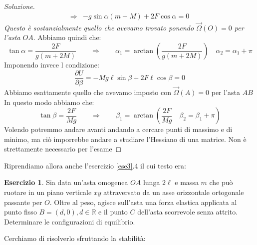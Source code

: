 \documentclass[11pt,a4paper,twoside]{article}
\theoremstyle{definition}
\newtheorem{ese}{Esercizio}[section]
\newenvironment{sol}
	{\renewcommand\qedsymbol{$\blacksquare$}\begin{proof}[Soluzione]}
	{\end{proof}}
\begin{document}
\begin{sol}
\begin{align*}
		\Rightarrow & -g \sin\alpha(m+M) + 2F\cos \alpha = 0
	\end{align*}
	\textit{Questo è sostanzialmente quello che avevamo trovato ponendo $\vec \Omega(O) = 0$ per l'asta $OA$}. Abbiamo quindi che:
	\[ \tan \alpha = \frac{2F}{g(m+2M)}\qquad \Rightarrow \qquad \alpha_1 = \arctan\left(\frac{2F}{g(m+2M)}\right) \quad \alpha_2 = \alpha_1 + \pi\]
	Imponendo invece l condizione:
	\[ \frac{\partial U}{\partial \beta} = -Mg\ell \sin \beta + 2F\ell \cos \beta = 0 \]
	Abbiamo esattamente quello che avevamo imposto con $\vec \Omega(A) = 0$ per l'asta $AB$
	In questo modo abbiamo che:
	\[ \tan \beta = \frac{2F}{Mg} \qquad \Rightarrow\qquad \beta_1 = \arctan\left( \frac{2F}{Mg} \quad \beta_2 = \beta_1 + \pi \right) \]
	Volendo potremmo andare avanti andando a cercare punti di massimo e di minimo, ma ciò imporrebbe andare a studiare l'Hessiano di una matrice. Non è strettamente necessario per l'esame
\end{sol}

Riprendiamo allora anche l'esercizio \ref{ese3}.4 il cui testo era:

\begin{ese}
	Sia data un'asta omogenea $OA$ lunga $2\ell$ e massa $m$ che può ruotare in un piano verticale $xy$ attraversato da un asse orizzontale ortogonale passante per $O$. Oltre al peso, agisce sull'asta una forza elastica applicata al punto fisso $B = (d,0), d \in \mathbb R$ e il punto $C$ dell'asta scorrevole senza attrito. Determinare le configurazioni di equilibrio.
\end{ese}

Cerchiamo di risolverlo sfruttando la stabilità:
\end{document}
